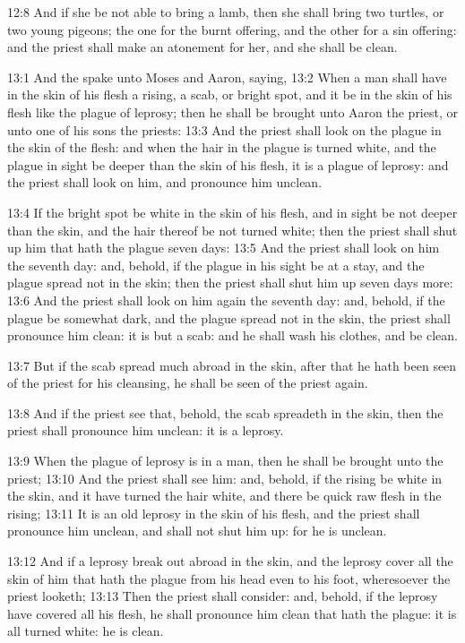 12:8 And if she be not able to bring a lamb, then she shall bring two turtles, or two young pigeons; the one for the burnt offering, and the other for a sin offering: and the priest shall make an atonement for her, and she shall be clean.

13:1 And the \LORD spake unto Moses and Aaron, saying, 13:2 When a man shall have in the skin of his flesh a rising, a scab, or bright spot, and it be in the skin of his flesh like the plague of leprosy; then he shall be brought unto Aaron the priest, or unto one of his sons the priests: 13:3 And the priest shall look on the plague in the skin of the flesh: and when the hair in the plague is turned white, and the plague in sight be deeper than the skin of his flesh, it is a plague of leprosy: and the priest shall look on him, and pronounce him unclean.

13:4 If the bright spot be white in the skin of his flesh, and in sight be not deeper than the skin, and the hair thereof be not turned white; then the priest shall shut up him that hath the plague seven days: 13:5 And the priest shall look on him the seventh day: and, behold, if the plague in his sight be at a stay, and the plague spread not in the skin; then the priest shall shut him up seven days more: 13:6 And the priest shall look on him again the seventh day: and, behold, if the plague be somewhat dark, and the plague spread not in the skin, the priest shall pronounce him clean: it is but a scab: and he shall wash his clothes, and be clean.

13:7 But if the scab spread much abroad in the skin, after that he hath been seen of the priest for his cleansing, he shall be seen of the priest again.

13:8 And if the priest see that, behold, the scab spreadeth in the skin, then the priest shall pronounce him unclean: it is a leprosy.

13:9 When the plague of leprosy is in a man, then he shall be brought unto the priest; 13:10 And the priest shall see him: and, behold, if the rising be white in the skin, and it have turned the hair white, and there be quick raw flesh in the rising; 13:11 It is an old leprosy in the skin of his flesh, and the priest shall pronounce him unclean, and shall not shut him up: for he is unclean.

13:12 And if a leprosy break out abroad in the skin, and the leprosy cover all the skin of him that hath the plague from his head even to his foot, wheresoever the priest looketh; 13:13 Then the priest shall consider: and, behold, if the leprosy have covered all his flesh, he shall pronounce him clean that hath the plague: it is all turned white: he is clean.

